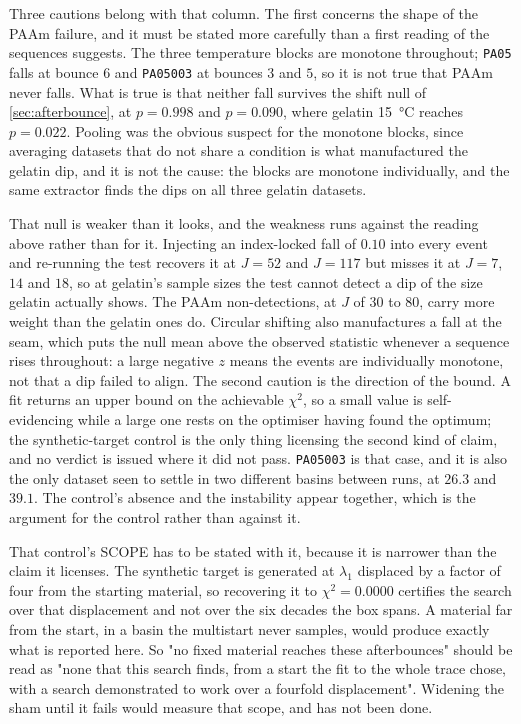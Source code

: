 \documentclass[10pt]{article}
\begin{document}
Three cautions belong with that column. The first concerns the shape of the PAAm failure, and it
must be stated more carefully than a first reading of the sequences suggests. The three
temperature blocks are monotone throughout; \texttt{PA05} falls at bounce $6$ and
\texttt{PA05003} at bounces $3$ and $5$, so it is not true that PAAm never falls. What is true is
that neither fall survives the shift null of \cref{sec:afterbounce}, at $p = 0.998$ and
$p = 0.090$, where gelatin \SI{15}{\celsius} reaches $p = 0.022$. Pooling was the obvious suspect
for the monotone blocks, since averaging datasets that do not share a condition is what
manufactured the gelatin dip, and it is not the cause: the blocks are monotone individually, and
the same extractor finds the dips on all three gelatin datasets.

That null is weaker than it looks, and the weakness runs against the reading above rather than
for it. Injecting an index-locked fall of $0.10$ into every event and re-running the test
recovers it at $J = 52$ and $J = 117$ but misses it at $J = 7$, $14$ and $18$, so at gelatin's
sample sizes the test cannot detect a dip of the size gelatin actually shows. The PAAm
non-detections, at $J$ of $30$ to $80$, carry more weight than the gelatin ones do. Circular
shifting also manufactures a fall at the seam, which puts the null mean above the observed
statistic whenever a sequence rises throughout: a large negative $z$ means the events are
individually monotone, not that a dip failed to align.
The second caution is the direction of the bound. A fit returns an upper bound on
the achievable $\chi^2$, so a small value is self-evidencing while a large one rests on the
optimiser having found the optimum; the synthetic-target control is the only thing licensing the
second kind of claim, and no verdict is issued where it did not pass. \texttt{PA05003} is that
case, and it is also the only dataset seen to settle in two different basins between runs, at
$26.3$ and $39.1$. The control's absence and the instability appear together, which is the
argument for the control rather than against it.

That control's SCOPE has to be stated with it, because it is narrower than the claim it
licenses. The synthetic target is generated at $\lambda_1$ displaced by a factor of four from
the starting material, so recovering it to $\chi^2 = 0.0000$ certifies the search over that
displacement and not over the six decades the box spans. A material far from the start, in a
basin the multistart never samples, would produce exactly what is reported here. So "no fixed
material reaches these afterbounces" should be read as "none that this search finds, from a
start the fit to the whole trace chose, with a search demonstrated to work over a fourfold
displacement". Widening the sham until it fails would measure that scope, and has not been done.
\end{document}
